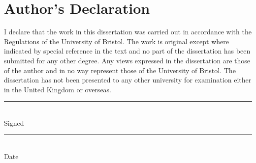 \chapter*{Author's Declaration}
I declare that the work in this dissertation was carried out in accordance
with the Regulations of the University of Bristol. The work is original
except where indicated by special reference in the text and no part of the
dissertation has been submitted for any other degree. Any views expressed
in the dissertation are those of the author and in no way represent those of
the University of Bristol. The dissertation has not been presented to any
other university for examination either in the United Kingdom or overseas.


\vspace{3cm}
\parbox{\textwidth}{
    \parbox{7cm}{
      \centering
      \rule{6cm}{1pt}\\
       Signed 
    }
    \hfill
    \parbox{7cm}{
      \centering
      \rule{6cm}{1pt}\\
      Date
    }
  }
